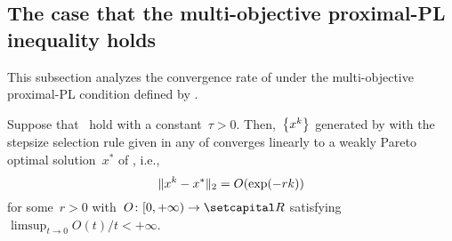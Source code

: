 \documentclass[../../main]{subfiles}
\begin{document}
\subsection{The case that the multi-objective proximal-PL inequality holds}
This subsection analyzes the convergence rate of  under the multi-objective proximal-PL condition defined by .

\begin{theorem} 
    Suppose that~ hold with a constant~$\tau > 0$.
    Then,~$\set*{x^k}$ generated by  with the stepsize selection rule given in any of  converges linearly to a weakly Pareto optimal solution~$x^*$ of , i.e.,
    \begin{equation}
        \norm{x^k - x^*}_2 = O(\exp (- r k))
    \end{equation}
    for some~$r > 0$ with~$O \colon [0, + \infty) \to \setR$ satisfying~$\limsup_{t \to 0} O(t) / t < + \infty$.
\end{theorem}
\end{document}
